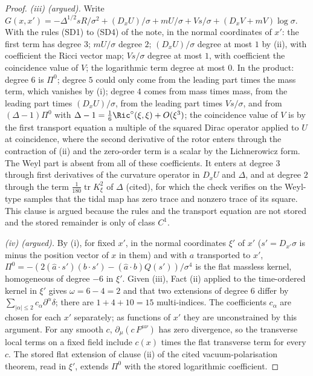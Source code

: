 \begin{proof}
\emph{(iii) (argued).} Write $G(x, x') = -\Delta^{1/2}sR/\sigma^{2} + (D_{x}U)/\sigma + mU/\sigma + Vs/\sigma + (D_{x}V + mV)\log\sigma$. With the rules (SD1) to (SD4) of the note, in the normal coordinates of $x'$: the first term has degree $3$; $mU/\sigma$ degree $2$; $(D_{x}U)/\sigma$ degree at most $1$ by (ii), with coefficient the Ricci vector map; $Vs/\sigma$ degree at most $1$, with coefficient the coincidence value of $V$; the logarithmic term degree at most $0$. In the product: degree $6$ is $\Pi^{0}$; degree $5$ could only come from the leading part times the mass term, which vanishes by (i); degree $4$ comes from mass times mass, from the leading part times $(D_{x}U)/\sigma$, from the leading part times $Vs/\sigma$, and from $(\Delta - 1)\Pi^{0}$ with $\Delta - 1 = \tfrac16\Ric^{\circ}(\xi, \xi) + O(\xi^{3})$; the coincidence value of $V$ is by the first transport equation a multiple of the squared Dirac operator applied to $U$ at coincidence, where the second derivative of the rotor enters through the contraction of (ii) and the zero-order term is a scalar by the Lichnerowicz form. The Weyl part is absent from all of these coefficients. It enters at degree $3$ through first derivatives of the curvature operator in $D_{x}U$ and $\Delta$, and at degree $2$ through the term $\tfrac1{180}\operatorname{tr}K_{\xi}^{2}$ of $\Delta$ (cited), for which the check verifies on the Weyl-type samples that the tidal map has zero trace and nonzero trace of its square. This clause is argued because the rules and the transport equation are not stored and the stored remainder is only of class $C^{1}$.

\emph{(iv) (argued).} By (i), for fixed $x'$, in the normal coordinates $\xi'$ of $x'$ ($s' = D_{x'}\sigma$ is minus the position vector of $x$ in them) and with $a$ transported to $x'$, $\Pi^{0} = -(2(\hat a\cdot s')(b\cdot s') - (\hat a\cdot b)Q(s'))/\sigma^{4}$ is the flat massless kernel, homogeneous of degree $-6$ in $\xi'$. Given (iii), Fact (ii) applied to the time-ordered kernel in $\xi'$ gives $\omega = 6 - 4 = 2$ and that two extensions of degree $6$ differ by $\sum_{|\alpha| \le 2}c_{\alpha}\partial^{\alpha}\delta$; there are $1 + 4 + 10 = 15$ multi-indices. The coefficients $c_{\alpha}$ are chosen for each $x'$ separately; as functions of $x'$ they are unconstrained by this argument. For any smooth $c$, $\partial_{\mu}(c\,F^{\mu\nu})$ has zero divergence, so the transverse local terms on a fixed field include $c(x)$ times the flat transverse term for every $c$. The stored flat extension of clause (ii) of the cited vacuum-polarisation theorem, read in $\xi'$, extends $\Pi^{0}$ with the stored logarithmic coefficient.
\end{proof}
